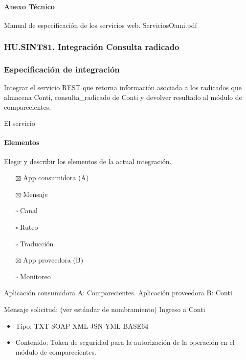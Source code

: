 \documentclass[
  paper=a4,
  ,captions=tableheading
]{scrartcl}
\providecommand{\tightlist}{%
  \setlength{\itemsep}{0pt}\setlength{\parskip}{0pt}}
\begin{document}
\paragraph{Anexo Técnico}\label{sec:anexo-tuxe9cnico}

Manual de especificación de los servicios web. ServiciosOami.pdf

\subsubsection{HU.SINT81. Integración Consulta
radicado}\label{sec:hu.sint81.-integraciuxf3n-consulta-radicado}

\subsubsection{Especificación de
integración}\label{sec:especificaciuxf3n-de-integraciuxf3n-1}

Integrar el servicio REST que retorna información asociada a los
radicados que almacena Conti, consulta\_radicado de Conti y devolver
resultado al módulo de comparecientes.

El servicio

\paragraph{Elementos}\label{sec:elementos-1}

Elegir y describir los elementos de la actual integración.

\begin{itemize}
\tightlist
\item[$\boxtimes$]
  App consumidora (A)
\item[$\boxtimes$]
  Mensaje
\item[$\square$]
  Canal
\item[$\square$]
  Ruteo
\item[$\square$]
  Traducción
\item[$\boxtimes$]
  App proveedora (B)
\item[$\square$]
  Monitoreo
\end{itemize}

Aplicación consumidora A: Comparecientes. Aplicación proveedora B: Conti

Mensaje solicitud: (ver estándar de nombramiento) Ingreso a Conti

\begin{itemize}
\tightlist
\item
  Tipo: TXT \textbar{} SOAP \textbar{} XML \textbar{} JSN \textbar{} YML
  \textbar{} BASE64
\item
  Contenido: Token de seguridad para la autorización de la operación en
  el módulo de comparecientes.
\end{itemize}
\end{document}
